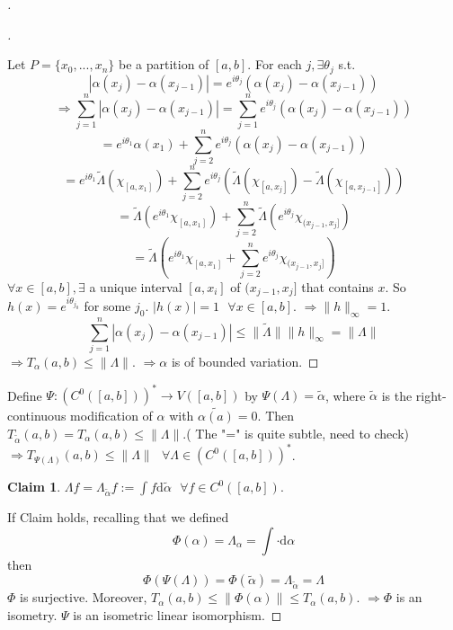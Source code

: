 \documentclass{article}
\theoremstyle{definition}
\newtheorem*{clm}{Claim}
\newenvironment{proofs}[1][\proofname]{%
  \begin{proof}[#1]$ $\par\nobreak\ignorespaces
}{%
  \end{proof}
}
\newcommand{\sfa}{\text{  } \forall}
\begin{document}
\begin{proofs}
	\begin{proofs}
		Let $P = \{x_0, ..., x_n\}$ be a partition of $[a, b]$.
		For each $j, \exists \theta_j$ s.t.
		\[
			|\alpha(x_j) - \alpha(x_{j - 1})| = e^{i \theta_j}(\alpha(x_j) - \alpha(x_{j - 1}))
		\]
		\[
			\Rightarrow \sum_{j = 1}^n |\alpha(x_j) - \alpha(x_{j - 1})| = \sum_{j = 1}^n e^{i \theta_j}(\alpha(x_j) - \alpha(x_{j - 1}))
		\]
		\[
			 = e^{i \theta_1} \alpha(x_1) + \sum_{j = 2}^n e^{i \theta_j} (\alpha(x_j) - \alpha(x_{j - 1}))
		 \]
		\[
			= e^{i \theta_1} \tilde{\Lambda}(\chi_{[a, x_1]}) + \sum_{j = 2}^n e^{i \theta_j}(\tilde{\Lambda}(\chi_{[a, x_j]}) - \tilde{\Lambda}(\chi_{[a, x_{j - 1}]}))
		\]
		\[
			= \tilde{\Lambda}(e^{i \theta_1} \chi_{[a, x_1]}) + \sum_{j = 2}^n \tilde{\Lambda}(e^{i \theta_j} \chi_{(x_{j - 1}, x_j]})
		\]
		\[
			= \tilde{\Lambda}(e^{i \theta_1} \chi_{[a, x_1]} + \sum_{j = 2}^n e^{i \theta_j} \chi_{(x_{j - 1}, x_j]})
		\]
		$\forall x \in [a, b], \exists$ a unique interval $[a,x_i]$ of $(x_{j - 1}, x_j]$ that contains $x$.
		So $h(x) = e^{i \theta_{j_0}}$ for some $j_0$.
		$|h(x)| = 1 \sfa x \in [a, b]$.
		$\Rightarrow \|h\|_{\infty} = 1$.
		\[
			\sum_{j = 1}^n |\alpha(x_j) - \alpha(x_{j - 1})| \leq \|\tilde{\Lambda}\|\|h\|_{\infty} = \|\Lambda\|
		\]
		$\Rightarrow T_\alpha(a, b) \leq \|\Lambda\|$.
		$\Rightarrow \alpha$ is of bounded variation.
	\end{proofs}
	Define $\Psi:(C^0([a, b]))^* \to V([a, b])$ by $\Psi(\Lambda) = \tilde{\alpha}$, where $\tilde{\alpha}$ is the right-continuous modification of $\alpha$ with $\tilde{\alpha(a)} = 0$.
	Then $T_{\tilde{\alpha}}(a, b) = T_\alpha(a, b) \leq \|\Lambda \|$.( The "=" is quite subtle, need to check)
	$\Rightarrow T_{\Psi(\Lambda)}(a, b) \leq \|\Lambda\| \sfa \Lambda \in (C^0([a, b]))^*$.
	\begin{clm}
		$\Lambda f = \Lambda_{\tilde{\alpha}} f := \int f \mathrm{d} \tilde{\alpha} \sfa f \in C^0([a, b])$.
	\end{clm}
	If Claim holds, recalling that we defined 
	\[
		\Phi(\alpha) = \Lambda_\alpha = \int \cdot \mathrm{d} \alpha
	\]
	then
	\[
		\Phi(\Psi(\Lambda)) = \Phi(\tilde{\alpha}) = \Lambda_{\tilde{\alpha}} = \Lambda
	\]
	$\Phi$ is surjective.
	Moreover, $T_\alpha(a, b) \leq \|\Phi(\alpha)\| \leq T_\alpha(a, b)$.
	$\Rightarrow \Phi$ is an isometry.
	$\Psi$ is an isometric linear isomorphism.


\end{proofs}
\end{document}
